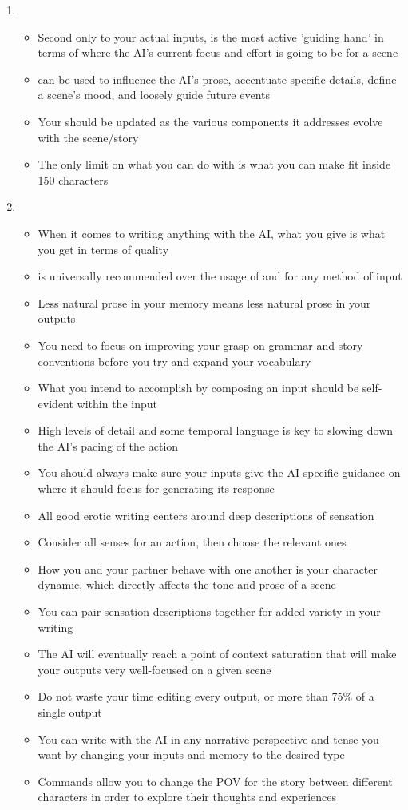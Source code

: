 ﻿\documentclass[Coomer-main.tex]{subfiles}
\begin{document}
\begin{enumerate}
\item {}

\begin{itemize}
\item Second only to your actual inputs, \an is the most active 'guiding hand' in terms of where the AI's current focus and effort is going to be for a scene
\item \an can be used to influence the AI's prose, accentuate specific details, define a scene's mood, and loosely guide future events
\item Your \an should be updated as the various components it addresses evolve with the scene/story
\item The only limit on what you can do with \an is what you can make fit inside 150 characters
\end{itemize}

\item {}

\begin{itemize}
\item When it comes to writing anything with the AI, what you give is what you get in terms of quality
\item \story is universally recommended over the usage of \do and \say for any method of input
\item Less natural prose in your memory means less natural prose in your outputs
\item You need to focus on improving your grasp on grammar and story conventions before you try and expand your vocabulary
\item What you intend to accomplish by composing an input should be self-evident within the input
\item High levels of detail and some temporal language is key to slowing down the AI's pacing of the action
\item You should always make sure your inputs give the AI specific guidance on where it should focus for generating its response
\item All good erotic writing centers around deep descriptions of sensation
\item Consider all senses for an action, then choose the relevant ones
\item How you and your partner behave with one another is your character dynamic, which directly affects the tone and prose of a scene
\item You can pair sensation descriptions together for added variety in your writing
\item The AI will eventually reach a point of context saturation that will make your outputs very well-focused on a given scene
\item Do not waste your time editing every output, or more than 75\% of a single output
\item You can write with the AI in any narrative perspective and tense you want by changing your inputs and memory to the desired type
\item Commands allow you to change the POV for the story between different characters in order to explore their thoughts and experiences
\end{itemize}


\end{enumerate}
\end{document}
